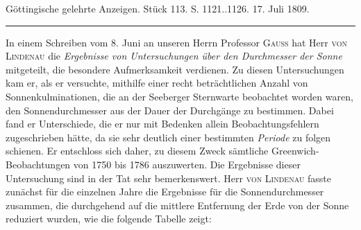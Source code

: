 \clearpage
{}
\hypertarget{native-524-lower}{}\label{native-524-lower}
\begin{center}\small Göttingische gelehrte Anzeigen. Stück 113. S. 1121..1126. 17. Juli 1809.\\[3pt]\rule{.72\linewidth}{.3pt}\end{center}

In einem Schreiben vom 8. Juni an unseren Herrn Professor \textsc{Gauss} hat Herr \textsc{von Lindenau} die \emph{Ergebnisse von Untersuchungen über den Durchmesser der Sonne} mitgeteilt, die besondere Aufmerksamkeit verdienen. Zu diesen Untersuchungen kam er, als er versuchte, mithilfe einer recht beträchtlichen Anzahl von Sonnenkulminationen, die an der Seeberger Sternwarte beobachtet worden waren, den Sonnendurchmesser aus der Dauer der Durchgänge zu bestimmen. Dabei fand er Unterschiede, die er nur mit Bedenken allein Beobachtungsfehlern zugeschrieben hätte, da sie sehr deutlich einer bestimmten \emph{Periode} zu folgen schienen. Er entschloss sich daher, zu diesem Zweck sämtliche Greenwich-Beobachtungen von 1750 bis 1786 auszuwerten. Die Ergebnisse dieser Untersuchung sind in der Tat sehr bemerkenswert. Herr \textsc{von Lindenau} fasste zunächst für die einzelnen Jahre die Ergebnisse für die Sonnendurchmesser zusammen, die durchgehend auf die mittlere Entfernung der Erde von der Sonne reduziert wurden, wie die folgende Tabelle zeigt:

